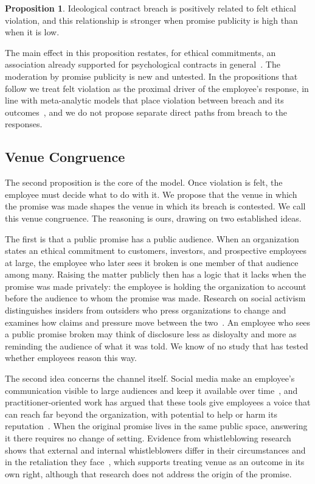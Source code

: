 \documentclass[12pt,a4paper]{article}
\theoremstyle{definition}
\newtheorem{proposition}{Proposition}
\begin{document}
\begin{proposition}
Ideological contract breach is positively related to felt ethical violation, and this relationship is stronger when promise publicity is high than when it is low.
\end{proposition}

The main effect in this proposition restates, for ethical commitments, an association already supported for psychological contracts in general~\citep{zhao2007impact}. The moderation by promise publicity is new and untested. In the propositions that follow we treat felt violation as the proximal driver of the employee's response, in line with meta-analytic models that place violation between breach and its outcomes~\citep{zhao2007impact}, and we do not propose separate direct paths from breach to the responses.

\subsection{Venue Congruence}

The second proposition is the core of the model. Once violation is felt, the employee must decide what to do with it. We propose that the venue in which the promise was made shapes the venue in which its breach is contested. We call this venue congruence. The reasoning is ours, drawing on two established ideas.

The first is that a public promise has a public audience. When an organization states an ethical commitment to customers, investors, and prospective employees at large, the employee who later sees it broken is one member of that audience among many. Raising the matter publicly then has a logic that it lacks when the promise was made privately: the employee is holding the organization to account before the audience to whom the promise was made. Research on social activism distinguishes insiders from outsiders who press organizations to change and examines how claims and pressure move between the two~\citep{briscoe2016social}. An employee who sees a public promise broken may think of disclosure less as disloyalty and more as reminding the audience of what it was told. We know of no study that has tested whether employees reason this way.

The second idea concerns the channel itself. Social media make an employee's communication visible to large audiences and keep it available over time~\citep{treem2013social}, and practitioner-oriented work has argued that these tools give employees a voice that can reach far beyond the organization, with potential to help or harm its reputation~\citep{miles2014employee}. When the original promise lives in the same public space, answering it there requires no change of setting. Evidence from whistleblowing research shows that external and internal whistleblowers differ in their circumstances and in the retaliation they face~\citep{dworkin1998internal}, which supports treating venue as an outcome in its own right, although that research does not address the origin of the promise.
\end{document}
